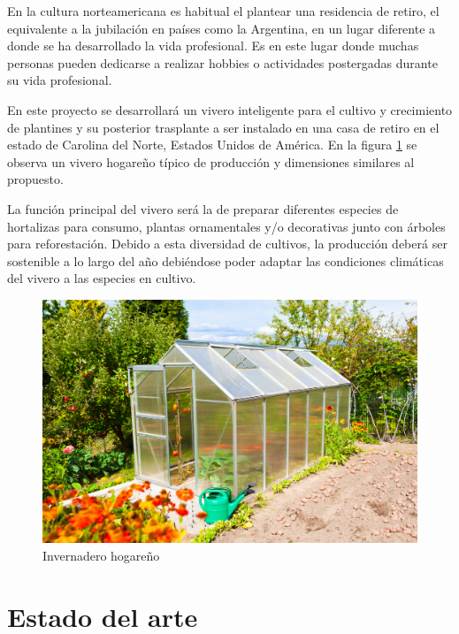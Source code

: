 En la cultura norteamericana es habitual el plantear una residencia de retiro, el equivalente a la jubilación en países como la Argentina, en un lugar diferente a donde se ha desarrollado la vida profesional.
Es en este lugar donde muchas personas pueden dedicarse a realizar hobbies o actividades postergadas durante su vida profesional. \citep{RelocatingAfterRetiring} \citep{Kim2021}

En este proyecto se desarrollará un vivero inteligente para el cultivo y crecimiento de plantines y su posterior trasplante a ser instalado en una casa de retiro en el estado de Carolina del Norte, Estados Unidos de América. 
En la figura \ref{fig:imgInvernadero} se observa un vivero hogareño típico de producción y dimensiones similares al propuesto.


La función principal del vivero será la de preparar diferentes especies de hortalizas para consumo, plantas ornamentales y/o decorativas junto con árboles para reforestación. Debido a esta diversidad de cultivos, la producción deberá ser sostenible a lo largo del año debiéndose poder adaptar las condiciones climáticas del vivero a las especies en cultivo. 

\begin{figure}[htpb]
\centering 
\includegraphics[width=.7\textwidth]{../Figures/invernadero1.jpg}
\caption{Invernadero hogareño}
\label{fig:imgInvernadero}
\end{figure}



\section{Estado del arte}
\label{sec:Estado del arte}

